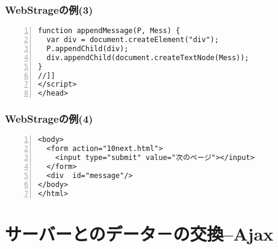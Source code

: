 \begin{frame}[containsverbatim]
 \frametitle{WebStrageの例(3)}
  \begin{Verbatim}[numbers=left, fontsize=\small]
function appendMessage(P, Mess) {
  var div = document.createElement("div");
  P.appendChild(div);
  div.appendChild(document.createTextNode(Mess));
}
//]]
</script>
</head>
 \end{Verbatim}
\end{frame}
\begin{frame}[containsverbatim]
 \frametitle{WebStrageの例(4)}
  \begin{Verbatim}[numbers=left, fontsize=\small]
<body>
  <form action="10next.html">
    <input type="submit" value="次のページ"></input>
  </form>
  <div  id="message"/>
</body>
</html>
\end{Verbatim}
\end{frame}
\section{サーバーとのデータ－の交換--Ajax}
